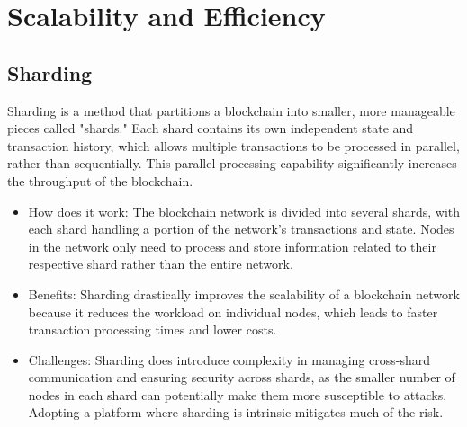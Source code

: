 \documentclass{tufte-handout}
\begin{document}
\section{Scalability and Efficiency}\label{sec:page-layout}
\subsection{Sharding}\label{sec:headings}
Sharding is a method that partitions a blockchain into smaller, more manageable pieces called "shards." Each shard contains its own independent state and transaction history,
which allows multiple transactions to be processed in parallel, rather than sequentially. This parallel processing capability significantly increases the throughput of the blockchain.
\begin{itemize}
\item How does it work: The blockchain network is divided into several shards, with each shard handling a portion of the network's transactions and state. Nodes in the
network only need to process and store information related to their respective shard rather than the entire network.
\item Benefits: Sharding drastically improves the scalability of a blockchain network because it reduces the workload on individual nodes, which leads to faster transaction
processing times and lower costs.
\item Challenges: Sharding does introduce complexity in managing cross-shard communication and ensuring security across shards, as the smaller number of nodes in each shard
can potentially make them more susceptible to attacks. Adopting a platform where sharding is intrinsic mitigates much of the risk.
\end{itemize}
\end{document}
